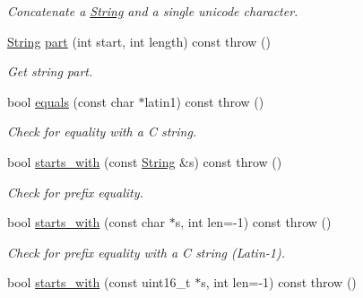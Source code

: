 \begin{CompactItemize}
\begin{CompactList}\small\item\em Concatenate a \hyperlink{classpmath_1_1_string}{String} and a single unicode character. \item\end{CompactList}\item 
\hypertarget{classpmath_1_1_string_8fbfc19f0bbbc1f657768be8cd697375}{
\hyperlink{classpmath_1_1_string}{String} \hyperlink{classpmath_1_1_string_8fbfc19f0bbbc1f657768be8cd697375}{part} (int start, int length) const   throw ()}
\label{classpmath_1_1_string_8fbfc19f0bbbc1f657768be8cd697375}

\begin{CompactList}\small\item\em Get string part. \item\end{CompactList}\item 
\hypertarget{classpmath_1_1_string_19b347bcc659699387241633e22fbb82}{
bool \hyperlink{classpmath_1_1_string_19b347bcc659699387241633e22fbb82}{equals} (const char $\ast$latin1) const   throw ()}
\label{classpmath_1_1_string_19b347bcc659699387241633e22fbb82}

\begin{CompactList}\small\item\em Check for equality with a C string. \item\end{CompactList}\item 
\hypertarget{classpmath_1_1_string_77794f4ca9717731a1eb6ab0b268c5fa}{
bool \hyperlink{classpmath_1_1_string_77794f4ca9717731a1eb6ab0b268c5fa}{starts\_\-with} (const \hyperlink{classpmath_1_1_string}{String} \&s) const   throw ()}
\label{classpmath_1_1_string_77794f4ca9717731a1eb6ab0b268c5fa}

\begin{CompactList}\small\item\em Check for prefix equality. \item\end{CompactList}\item 
\hypertarget{classpmath_1_1_string_40642efeb797446b6b10fa4f2773a9d1}{
bool \hyperlink{classpmath_1_1_string_40642efeb797446b6b10fa4f2773a9d1}{starts\_\-with} (const char $\ast$s, int len=-1) const   throw ()}
\label{classpmath_1_1_string_40642efeb797446b6b10fa4f2773a9d1}

\begin{CompactList}\small\item\em Check for prefix equality with a C string (Latin-1). \item\end{CompactList}\item 
\hypertarget{classpmath_1_1_string_b230840796ad74ddb8b8b964045f8d61}{
bool \hyperlink{classpmath_1_1_string_b230840796ad74ddb8b8b964045f8d61}{starts\_\-with} (const uint16\_\-t $\ast$s, int len=-1) const   throw ()}
\label{classpmath_1_1_string_b230840796ad74ddb8b8b964045f8d61}


\end{CompactItemize}
